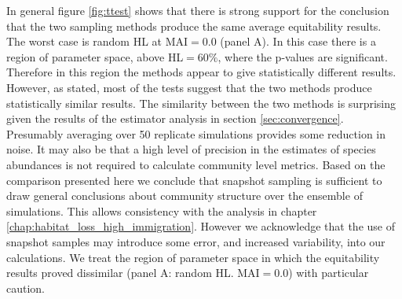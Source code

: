 \documentclass[12pt]{article}
\begin{document}
In general figure \ref{fig:ttest} shows that there is strong support for the conclusion that the two sampling methods produce the same average equitability results. The worst case is random HL at MAI$=0.0$ (panel A). In this case there is a region of parameter space, above HL$=60\%$, where the p-values are significant. Therefore in this region the methods appear to give statistically different results. However, as stated, most of the tests suggest that the two methods produce statistically similar results. The similarity between the two methods is surprising given the results of the estimator analysis in section \ref{sec:convergence}. Presumably averaging over 50 replicate simulations provides some reduction in noise. It may also be that a high level of precision in the estimates of species abundances is not required to calculate community level metrics. Based on the comparison presented here we conclude that snapshot sampling is sufficient to draw general conclusions about community structure over the ensemble of simulations. This allows consistency with the analysis in chapter \ref{chap:habitat_loss_high_immigration}. However we acknowledge that the use of snapshot samples may introduce some error, and increased variability, into our calculations. We treat the region of parameter space in which the equitability results proved dissimilar (panel A: random HL. MAI$=0.0$) with particular caution.
\end{document}
